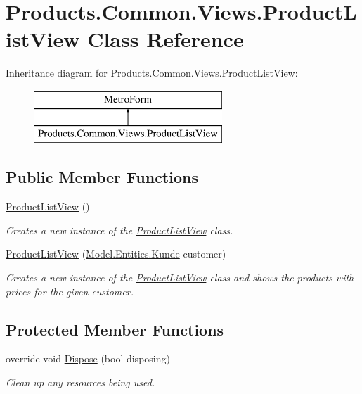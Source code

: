\hypertarget{class_products_1_1_common_1_1_views_1_1_product_list_view}{}\section{Products.\+Common.\+Views.\+Product\+List\+View Class Reference}
\label{class_products_1_1_common_1_1_views_1_1_product_list_view}
Inheritance diagram for Products.\+Common.\+Views.\+Product\+List\+View\+:\begin{figure}[H]
\begin{center}
\leavevmode
\includegraphics[height=2.000000cm]{class_products_1_1_common_1_1_views_1_1_product_list_view}
\end{center}
\end{figure}
\subsection*{Public Member Functions}
\begin{DoxyCompactItemize}
\item 
\hyperlink{class_products_1_1_common_1_1_views_1_1_product_list_view_a75fe996a1e26dc4446f0f808b1f3da1e}{Product\+List\+View} ()
\begin{DoxyCompactList}\small\item\em Creates a new instance of the \hyperlink{class_products_1_1_common_1_1_views_1_1_product_list_view}{Product\+List\+View} class. \end{DoxyCompactList}\item 
\hyperlink{class_products_1_1_common_1_1_views_1_1_product_list_view_abdee700821217d21e1102f1c73be2e65}{Product\+List\+View} (\hyperlink{class_products_1_1_model_1_1_entities_1_1_kunde}{Model.\+Entities.\+Kunde} customer)
\begin{DoxyCompactList}\small\item\em Creates a new instance of the \hyperlink{class_products_1_1_common_1_1_views_1_1_product_list_view}{Product\+List\+View} class and shows the products with prices for the given customer. \end{DoxyCompactList}\end{DoxyCompactItemize}
\subsection*{Protected Member Functions}
\begin{DoxyCompactItemize}
\item 
override void \hyperlink{class_products_1_1_common_1_1_views_1_1_product_list_view_ab1abcd66a89d30ebea4c8fba04f36945}{Dispose} (bool disposing)
\begin{DoxyCompactList}\small\item\em Clean up any resources being used. \end{DoxyCompactList}\end{DoxyCompactItemize}


